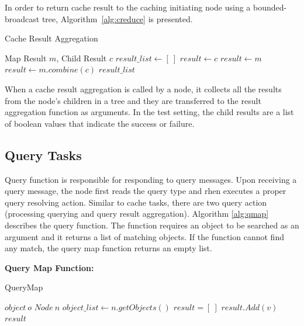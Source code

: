 \documentclass[9.5pt,journal,final,finalsubmission,twocolumn]{IEEEtran}
\begin{document}
In order to return cache result to the caching initiating node using a bounded-broadcast tree, Algorithm~\ref{alg:creduce} is presented.

\begin{algorithm}
\caption{Cache Result Aggregation}
\label{alg:creduce}
\begin{algorithmic}[1]
\REQUIRE Map Result $m$,  
\REQUIRE Child Result $c$ 
\STATE $result\_list \leftarrow [~]$
  \STATE $result \leftarrow c$
  \STATE $result \leftarrow m$
\ELSE
  \STATE $result \leftarrow m.combine(c)$
\ENDIF
\RETURN $result\_list$
\end{algorithmic}
\end{algorithm}

When a cache result aggregation is called by a node, 
it collects all the results from the node's children in a tree and 
they are transferred to the result aggregation function as arguments. 
In the test setting, the child results are a list of boolean values
that indicate the success or failure.

\subsection{Query Tasks}
Query function is responsible for responding to query messages. Upon receiving a query message, the node first reads the query type and rhen executes a proper query resolving action. Similar to cache tasks, there are two query action (processing querying and query result aggregation). Algorithm \ref{alg:qmap} describes the query function. The function requires an object to be searched as an argument
and it returns a list of matching objects. If the function cannot find
any match, the query map function returns an empty list.

\textbf{Query Map Function:} 
\begin{algorithm}
\caption{QueryMap}
\label{alg:qmap}
\begin{algorithmic}[1]
\REQUIRE $object~ o$     
\REQUIRE $Node~ n$
\STATE $object\_list \leftarrow n.getObjects()$ %
\STATE $result = [~]$
    \STATE $result.Add(v)$
  \ENDIF
\ENDFOR
\RETURN $result$
\end{algorithmic}
\end{algorithm}
\end{document}
